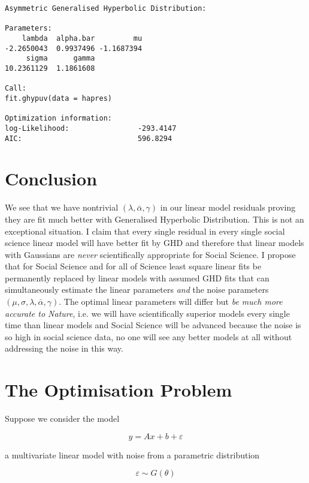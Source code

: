 \documentclass{amsart}
\begin{document}
\begin{verbatim}
Asymmetric Generalised Hyperbolic Distribution:

Parameters:
    lambda  alpha.bar         mu
-2.2650043  0.9937496 -1.1687394             
     sigma      gamma 
10.2361129  1.1861608 

Call:
fit.ghypuv(data = hapres)

Optimization information:
log-Likelihood:                -293.4147 
AIC:                           596.8294 
\end{verbatim}

\section{Conclusion}

We see that we have nontrivial $(\lambda,\bar{\alpha},\gamma)$ in our linear model residuals proving they are fit much better with Generalised Hyperbolic Distribution.  This is not an exceptional situation.  I claim that every single residual in every single social science linear model will have better fit by GHD and therefore that linear models with Gaussians are {\em never} scientifically appropriate for Social Science.  I propose that for Social Science and for all of Science least square linear fits be permanently replaced by linear models with assumed GHD fits that can simultaneously estimate the linear parameters {\em and} the noise parameters $(\mu,\sigma, \lambda,\bar{\alpha},\gamma)$.  The optimal linear parameters will differ but {\em be much more accurate to Nature}, i.e. we will have scientifically superior models every single time than linear models and Social Science will be advanced because the noise is so high in social science data, no one will see any better models at all without addressing the noise in this way.

\section{The Optimisation Problem}

Suppose we consider the model 

\begin{equation}
\label{lm}
y = Ax + b + \varepsilon
\end{equation}

a multivariate linear model with noise from a parametric distribution

\begin{equation}
\varepsilon \sim G(\theta)
\end{equation}
\end{document}
